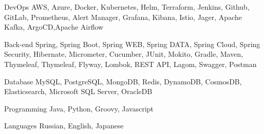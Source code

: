 

\begin{cvskills}

  \cvskill
    {DevOps} %
    {AWS, Azure, Docker, Kubernetes, Helm, Terraform, Jenkins, Github, GitLab, Prometheus,
     Alert Manager, Grafana, Kibana, Istio, Jager, Apache Kafka, ArgoCD,Apache Airflow} %

  \cvskill
    {Back-end} %
    {Spring, Spring Boot, Spring WEB, Spring DATA, Spring Cloud, Spring Security, Hibernate, 
    Micrometer, Cucumber, JUnit, Mokito, Gradle, Maven, Thymeleaf, Thymeleaf, Flyway, Lombok, REST API, Lagom, Swagger, Postman} %

  \cvskill
    {Database} %
    {MySQL, PostgreSQL, MongoDB, Redis, DynamoDB, CosmosDB, Elasticsearch,  Microsoft SQL Server, OracleDB} %

  \cvskill
    {Programming} %
    {Java, Python, Groovy, Javascript} %

  \cvskill
    {Languages} %
    {Russian, English, Japanese} %

\end{cvskills}
